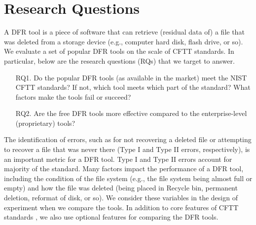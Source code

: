 \section{Research Questions}

A DFR tool is a piece of software that can retrieve (residual data of) a file that was deleted 
from a storage device (e.g., computer hard disk, flash drive, or so). We evaluate a set of 
popular DFR tools on the scale of CFTT standards. 
In particular, below are the research questions (RQs) that we target to answer. 

\begin{itemize}
\item[RQ1.] Do the popular DFR tools (as available in the market) meet the NIST CFTT standards? 
If not, which tool meets which part of the standard? What factors make the tools fail or succeed?

\item[RQ2.] Are the free DFR tools more effective compared to the enterprise-level (proprietary) tools?
\end{itemize}

The identification of errors, such as for not recovering a deleted file or attempting to recover a file that was never there 
(Type I and Type II errors, respectively), is an important metric for a DFR tool. 
Type I and Type II errors account for majority of the standard. Many factors impact the performance of a DFR tool, 
including the condition of the file system (e.g., the file system being almost full or empty) and 
how the file was deleted (being placed in Recycle bin, permanent deletion, reformat of disk, or so). 
We consider these variables in the design of experiment when we compare the tools. 
In addition to core features of CFTT standards \cite{cftt:nist}, we also use optional features \cite{cftt:nist} for comparing the DFR tools.

